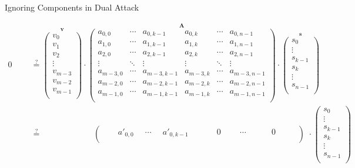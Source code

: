\documentclass[presentation,smaller]{beamer}
\renewcommand{\vec}[1]{\ensuremath{\mathbf{#1}}\xspace}
\begin{document}
\begin{frame}[label={sec:orgheadline51}]{Ignoring Components in Dual Attack}
\begin{center}
\scriptsize
\begin{align*}
0 \phantom{xxi} &\stackrel{?}{=} \overset{\vec{v}}{\begin{pmatrix}
v_0\\
v_1\\
v_2\\
\vdots\\
v_{m-3}\\
v_{m-2}\\
v_{m-1}\\
\end{pmatrix}} \cdot 
\overset{\vec{A}}{
\left(\begin{array}{ccc|ccc} 
a_{0,0} & \cdots & a_{0,k-1} & a_{0,k} & \cdots & a_{0,n-1}\\
a_{1,0} & \cdots & a_{1,k-1} & a_{1,k} & \cdots & a_{1,n-1}\\
a_{2,0} & \cdots & a_{2,k-1} & a_{2,k} & \cdots & a_{2,n-1}\\
\vdots  & \ddots & \vdots & \vdots & \ddots & \vdots\\
a_{m-3,0} & \cdots & a_{m-3,k-1} & a_{m-3,k} & \cdots & a_{m-3,n-1}\\
a_{m-2,0} & \cdots & a_{m-2,k-1} & a_{m-2,k} & \cdots & a_{m-2,n-1}\\
a_{m-1,0} & \cdots & a_{m-1,k-1} & a_{m-1,k} & \cdots & a_{m-1,n-1}\\
\end{array}\right)} \cdot 
\overset{\vec{s}}{\begin{pmatrix}s_0\\ \vdots\\ s_{k-1}\\ \hline s_k\\ \vdots\\ s_{n-1}\\ \end{pmatrix}}\\
&\stackrel{?}{=} \phantom{\begin{pmatrix}v_m-3\end{pmatrix} \cdot\ } \left(\begin{array}{ccc|ccc} 
\phantom{xxx} a'_{0,0} \phantom{x} & \cdots & \phantom{x} a'_{0,k-1} \phantom{xi} & \phantom{xxx} 0 \phantom{xxi} & \cdots & \phantom{xxxx} 0 \phantom{xxxx}\\
\end{array}\right) \phantom{i} \cdot {\begin{pmatrix}s_0\\ \vdots\\ s_{k-1}\\ \hline s_k\\ \vdots\\ s_{n-1}\\ \end{pmatrix}}\\
\end{align*}
\end{center}
\end{frame}
\end{document}
